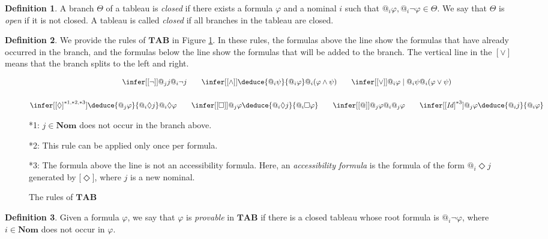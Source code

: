 \documentclass{article}
\theoremstyle{definition}
\newtheorem{definition}{Definition}[section]
\newcommand{\Nom}{\mathbf{Nom}}
\newcommand{\Dia}{\Diamond}
\newcommand{\tableau}{\mathbf{TAB}}
\newcommand{\Id}{\mathit{Id}}
\begin{document}
\begin{definition}
    A branch $\Theta$ of a tableau is \emph{closed} if there exists a formula $\varphi$ and a nominal $i$ such that $@_i \varphi, @_i \neg \varphi \in \Theta$. We say that $\Theta$ is \emph{open} if it is not closed. A tableau is called \emph{closed} if all branches in the tableau are closed.
    \label{defclose}
\end{definition}

\begin{definition}
  We provide the rules of $\tableau$ in Figure \ref{figrules}. In these rules, the formulas above the line show the formulas that have already occurred in the branch, and the formulas below the line show the formulas that will be added to the branch. The vertical line in the $[\lor]$ means that the branch splits to the left and right.
  \begin{figure}[tbp]
  \begin{gather*}
    \infer[{[\neg]}]
        {@_j j}
        {@_i \neg j}
    \qquad
    \infer[{[\land]}]
        {\deduce{@_i \psi} {@_i \varphi}}
        {@_i (\varphi \land \psi)}
    \qquad
    \infer[{[\lor]}]
        {@_i \varphi \mid @_i \psi}
        {@_i (\varphi \lor \psi)} \\
    \\
    \infer[{[\Dia]}^{*1, *2, *3}]
        {\deduce{@_j \varphi}{@_i \Dia j}}
        {@_i \Dia \varphi}
    \qquad
    \infer[{[\Box]}]
        {@_j \varphi}
        {\deduce{@_i \Dia j}{@_i \Box \varphi}}
    \qquad
    \infer[{[@]}]
        {@_j \varphi}
        {@_i @_j \varphi}
    \qquad
    \infer[{[\Id]}^{*3}]
        {@_j \varphi}
        {\deduce{@_i j} {@_i \varphi}}
  \end{gather*}
  
  *1: $j \in \Nom$ does not occur in the branch above.

  *2: This rule can be applied only once per formula.

  *3: The formula above the line is not an accessibility formula. Here, an \emph{accessibility formula} is the formula of the form $@_i \Dia j$ generated by [$\Dia$], where $j$ is a new nominal.
  \caption{The rules of $\tableau$}
  \label{figrules}
  \end{figure}
  \label{defrules}
\end{definition}

\begin{definition}
    Given a formula $\varphi$, we say that $\varphi$ is \emph{provable} in $\tableau$ if there is a closed tableau whose root formula is $@_i \neg \varphi$, where $i \in \Nom$ does not occur in $\varphi$.
\end{definition}
\end{document}
